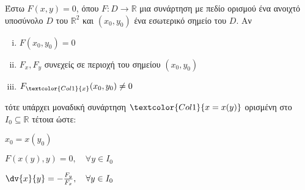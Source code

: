 \documentclass[a4paper,table]{report}
\begin{document}
Έστω $ F(x,y) = 0 $, όπου $ F\colon D \to \mathbb{R} $ μια συνάρτηση με πεδίο
ορισμού ένα ανοιχτό υποσύνολο $D$ του $\mathbb{R}^{2}$ και $ (x_0,y_0) $ ένα 
εσωτερικό σημείο του $D$.  Αν 
\begin{enumerate}[(i)]
  \item $F(x_0,y_0) = 0$ 
  \item $ F_x, F_y$ συνεχείς σε περιοχή του σημείου $ (x_0,y_0) $ 
  \item $ F_{\textcolor{Col1}{x}}(x_0,y_0) \neq 0 $
\end{enumerate}
τότε υπάρχει μοναδική συνάρτηση $ \textcolor{Col1}{x=x(y)} $ ορισμένη στο 
$ I_0 \subseteq \mathbb{R} $ τέτοια ώστε:
\begin{myitemize}
  \item $x_0 = x(y_0)$
  \item $F(x(y),y) = 0, \quad \forall y \in I_0$
  \item $ \dv{x}{y} = - \frac{F_y}{F_x}, \quad \forall y \in I_0  $
\end{myitemize}
\end{document}
